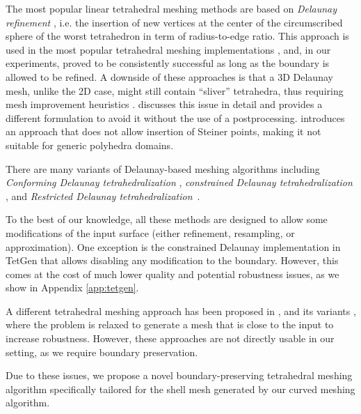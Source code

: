 The most popular linear tetrahedral meshing methods are based on {\em Delaunay refinement}
\cite{chew1993guaranteed,shewchuk1998tetrahedral,ruppert1995delaunay}, i.e. the insertion of new vertices at the center of the circumscribed sphere of the worst
tetrahedron in term of radius-to-edge ratio. This approach is used in the most popular tetrahedral meshing implementations  \cite{tetgen,jamin2015cgalmesh}, and, in
our experiments, proved to be consistently successful as long as the boundary is allowed to be refined. A downside of these approaches is that a 3D Delaunay mesh, unlike the 2D case, might still contain ``sliver'' tetrahedra, thus requiring mesh improvement
heuristics \cite{cheng2000silver,du2003tetrahedral,alliez2005variational,tournois2009interleaving}. \cite{Alexa:2019} discusses this issue in detail and provides a different formulation to avoid it without the use of a postprocessing. 
%
\cite{alexa2020conforming} introduces an approach that does not allow insertion of Steiner points, making it not suitable for generic polyhedra domains.

There are many variants of {Delaunay-based} meshing algorithms including 
{\em Conforming Delaunay tetrahedralization}
\cite{murphy2001point,CohenSteiner:2002:CDT}, {\em constrained Delaunay tetrahedralization}
\cite{chew1989constrained,si2005meshing,shewchuk2002constrained,Si:2014:ICA}, and {\em Restricted Delaunay tetrahedralization}\ \cite{cheng2008practical,boissonnat2005provably,Engwirda16}.

To the best of our knowledge, all these methods are designed to allow some modifications of the input surface (either refinement, resampling, or approximation). One exception is the constrained Delaunay implementation in TetGen \cite{tetgen} that allows disabling any modification to the boundary. However, this comes at the cost of much lower quality and potential robustness issues, as we show in Appendix \ref{app:tetgen}. 

A different tetrahedral meshing approach has been proposed in \cite{hu2018tetrahedral}, and its variants \cite{Hu:2020:fTetWild,hu2019triwild}, where the problem is relaxed to generate a mesh that is close to the input to increase robustness. However, these approaches are not directly usable in our setting, as we require boundary preservation.

Due to these issues, we propose a novel boundary-preserving tetrahedral meshing algorithm specifically tailored for the shell mesh generated by our curved meshing algorithm.

